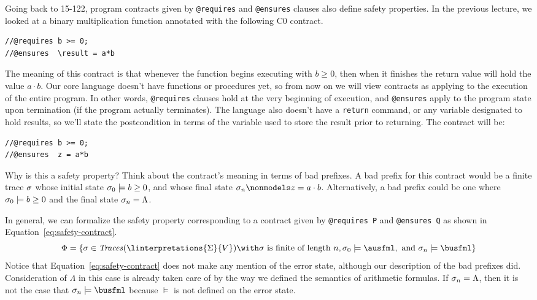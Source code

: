 \documentclass[11pt,twoside]{scrartcl}
\newcommand{\errstate}{\ensuremath{\Lambda}\xspace}
\begin{document}
Going back to 15-122, program contracts given by \verb'@requires' and \verb'@ensures' clauses also define safety properties. In the previous lecture, we looked at a binary multiplication function annotated with the following C0 contract.
\begin{verbatim}
//@requires b >= 0;
//@ensures  \result = a*b
\end{verbatim}
The meaning of this contract is that whenever the function begins executing with $b \ge 0$, then when it finishes the return value will hold the value $a \cdot b$. Our core language doesn't have functions or procedures yet, so from now on we will view contracts as applying to the execution of the entire program. In other words, \verb'@requires' clauses hold at the very beginning of execution, and \verb'@ensures' apply to the program state upon termination (if the program actually terminates). The language also doesn't have a \verb'return' command, or any variable designated to hold results, so we'll state the postcondition in terms of the variable used to store the result prior to returning. The contract will be:
\begin{verbatim}
//@requires b >= 0;
//@ensures  z = a*b
\end{verbatim}

Why is this a safety property? Think about the contract's meaning in terms of bad prefixes. A bad prefix for this contract would be a finite trace $\sigma$ whose initial state $\sigma_0 \models b \ge 0$, and whose final state $\atrace_n \nonmodels z = a \cdot b$. Alternatively, a bad prefix could be one where $\sigma_0 \models b \ge 0$ and the final state $\atrace_n = \errstate$.

In general, we can formalize the safety property corresponding to a contract given by \verb'@requires P' and \verb'@ensures Q' as shown in Equation~\ref{eq:safety-contract}.
\begin{equation}
\label{eq:safety-contract}
\Phi = \{\atrace \in \ttraces{\linterpretations{\Sigma}{V}} \with \atrace~\text{is finite of length}~n, \atrace_0 \models \ausfml,~\text{and}~\atrace_n \models \busfml\}
\end{equation}
Notice that Equation~\ref{eq:safety-contract} does not make any mention of the error state, although our description of the bad prefixes did. Consideration of \errstate in this case is already taken care of by the way we defined the semantics of arithmetic formulas. If $\atrace_n = \errstate$, then it is not the case that $\atrace_n \models \busfml$ because $\models$ is not defined on the error state.
\end{document}
